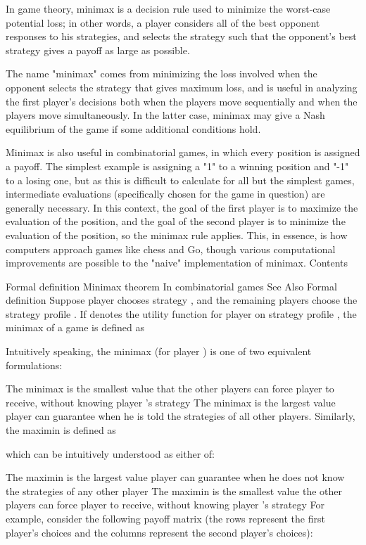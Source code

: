 
In game theory, minimax is a decision rule used to minimize the worst-case potential loss; in other words, a player considers all of the best opponent responses to his strategies, and selects the strategy such that the opponent's best strategy gives a payoff as large as possible.

The name "minimax" comes from minimizing the loss involved when the opponent selects the strategy that gives maximum loss, and is useful in analyzing the first player's decisions both when the players move sequentially and when the players move simultaneously. In the latter case, minimax may give a Nash equilibrium of the game if some additional conditions hold.

Minimax is also useful in combinatorial games, in which every position is assigned a payoff. The simplest example is assigning a "1" to a winning position and "-1" to a losing one, but as this is difficult to calculate for all but the simplest games, intermediate evaluations (specifically chosen for the game in question) are generally necessary. In this context, the goal of the first player is to maximize the evaluation of the position, and the goal of the second player is to minimize the evaluation of the position, so the minimax rule applies. This, in essence, is how computers approach games like chess and Go, though various computational improvements are possible to the "naive" implementation of minimax.
Contents

Formal definition
Minimax theorem
In combinatorial games
See Also
Formal definition
Suppose player  chooses strategy , and the remaining players choose the strategy profile . If  denotes the utility function for player on strategy profile , the minimax of a game is defined as


Intuitively speaking, the minimax (for player ) is one of two equivalent formulations:

The minimax is the smallest value that the other players can force player  to receive, without knowing player 's strategy
The minimax is the largest value player  can guarantee when he is told the strategies of all other players.
Similarly, the maximin is defined as


which can be intuitively understood as either of:

The maximin is the largest value player  can guarantee when he does not know the strategies of any other player
The maximin is the smallest value the other players can force player  to receive, without knowing player 's strategy
For example, consider the following payoff matrix (the rows represent the first player's choices and the columns represent the second player's choices):

